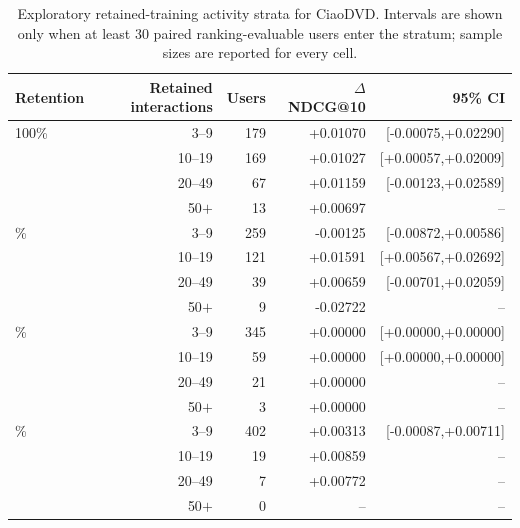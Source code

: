 \begin{table}[H]
\centering
\caption{Exploratory retained-training activity strata for CiaoDVD. Intervals are shown only when at least 30 paired ranking-evaluable users enter the stratum; sample sizes are reported for every cell.}
\label{tab:supp-activity-ciaodvd}
\small
\begin{tabular}{@{}lrrrr@{}}
\toprule
Retention & Retained interactions & Users & $\Delta$ NDCG@10 & 95\% CI \\
\midrule
100\% & 3--9 & 179 & +0.01070 & [-0.00075,+0.02290] \\
 & 10--19 & 169 & +0.01027 & [+0.00057,+0.02009] \\
 & 20--49 & 67 & +0.01159 & [-0.00123,+0.02589] \\
 & 50$+$ & 13 & +0.00697 & -- \\
\addlinespace
75\% & 3--9 & 259 & -0.00125 & [-0.00872,+0.00586] \\
 & 10--19 & 121 & +0.01591 & [+0.00567,+0.02692] \\
 & 20--49 & 39 & +0.00659 & [-0.00701,+0.02059] \\
 & 50$+$ & 9 & -0.02722 & -- \\
\addlinespace
50\% & 3--9 & 345 & +0.00000 & [+0.00000,+0.00000] \\
 & 10--19 & 59 & +0.00000 & [+0.00000,+0.00000] \\
 & 20--49 & 21 & +0.00000 & -- \\
 & 50$+$ & 3 & +0.00000 & -- \\
\addlinespace
25\% & 3--9 & 402 & +0.00313 & [-0.00087,+0.00711] \\
 & 10--19 & 19 & +0.00859 & -- \\
 & 20--49 & 7 & +0.00772 & -- \\
 & 50$+$ & 0 & -- & -- \\
\bottomrule
\end{tabular}
\end{table}
